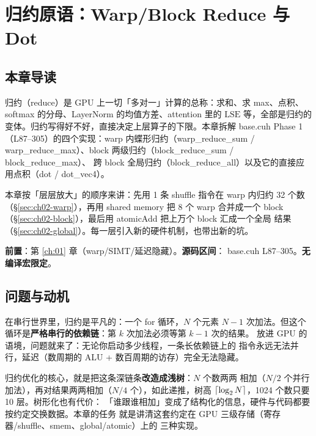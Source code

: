 \chapter{归约原语：Warp/Block Reduce 与 Dot}\label{ch:02}

\section{本章导读}

归约（reduce）是 GPU 上一切「多对一」计算的总称：求和、求 max、点积、softmax
的分母、LayerNorm 的均值方差、attention 里的 $\mathrm{LSE}$ 等，全部是归约的
变体。归约写得好不好，直接决定上层算子的下限。本章拆解
base.cuh Phase 1（L87--305）的四个实现：warp 内蝶形归约（warp\_reduce\_sum /
warp\_reduce\_max）、block 两级归约（block\_reduce\_sum / block\_reduce\_max）、
跨 block 全局归约（block\_reduce\_all）以及它的直接应用点积（dot /
dot\_vec4）。

本章按「层层放大」的顺序来讲：先用 1 条 shuffle 指令在 warp 内归约 32 个数
（\S\ref{sec:ch02-warp}），再用 shared memory 把 8 个 warp 合并成一个 block
（\S\ref{sec:ch02-block}），最后用 atomicAdd 把上万个 block 汇成一个全局
结果（\S\ref{sec:ch02-global}）。每一层引入新的硬件机制，也带出新的坑。

\textbf{前置}：第 \ref{ch:01} 章（warp/SIMT/延迟隐藏）。\textbf{源码区间}：
base.cuh L87--305。\textbf{无编译宏限定}。

\section{问题与动机}

在串行世界里，归约是平凡的：一个 for 循环，$N$ 个元素 $N-1$ 次加法。但这个
循环是\textbf{严格串行的依赖链}：第 $k$ 次加法必须等第 $k-1$ 次的结果。
放进 GPU 的语境，问题就来了：无论你启动多少线程，一条长依赖链上的
指令永远无法并行，延迟（数周期的 ALU + 数百周期的访存）完全无法隐藏。

归约优化的核心，就是把这条深链条\textbf{改造成浅树}：$N$ 个数两两
相加（$N/2$ 个并行加法），再对结果两两相加（$N/4$ 个），如此递推，树高
$\lceil \log\sb 2 N \rceil$，1024 个数只要 10 层。树形化也有代价：
「谁跟谁相加」变成了结构化的信息，硬件与代码都要按约定交换数据。本章的任务
就是讲清这套约定在 GPU 三级存储（寄存器/shuffle、smem、global/atomic）上的
三种实现。

